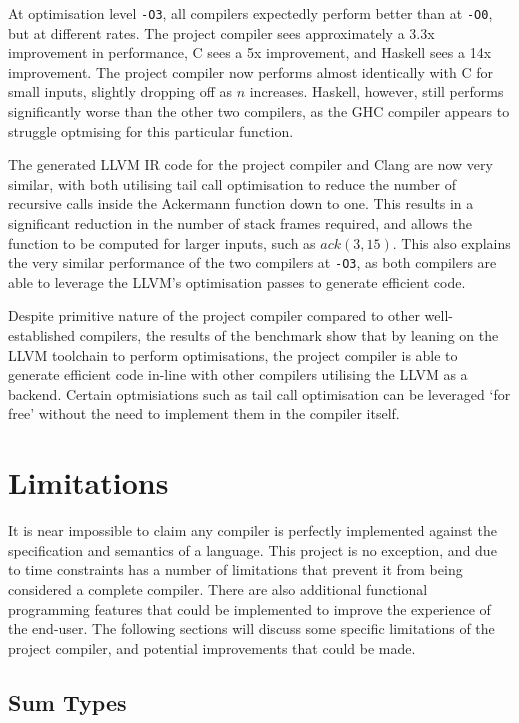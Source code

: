 At optimisation level \texttt{-O3}, all compilers expectedly perform better than at \texttt{-O0},
but at different rates. The project compiler sees approximately a 3.3x improvement in performance, C
sees a 5x improvement, and Haskell sees a 14x improvement. The project compiler now performs almost
identically with C for small inputs, slightly dropping off as $n$ increases. Haskell, however, still
performs significantly worse than the other two compilers, as the GHC compiler appears to struggle
optmising for this particular function.

The generated LLVM IR code for the project compiler and Clang are now very similar, with both
utilising tail call optimisation to reduce the number of recursive calls inside the Ackermann
function down to one. This results in a significant reduction in the number of stack frames
required, and allows the function to be computed for larger inputs, such as $ack(3,15)$. This also
explains the very similar performance of the two compilers at \texttt{-O3}, as both compilers are
able to leverage the LLVM's optimisation passes to generate efficient code.

Despite primitive nature of the project compiler compared to other well-established compilers, the
results of the benchmark show that by leaning on the LLVM toolchain to perform optimisations, the
project compiler is able to generate efficient code in-line with other compilers utilising the LLVM
as a backend. Certain optmisiations such as tail call optimisation can be leveraged `for free'
without the need to implement them in the compiler itself.

\section{Limitations}

It is near impossible to claim any compiler is perfectly implemented against the specification and
semantics of a language. This project is no exception, and due to time constraints has a number of
limitations that prevent it from being considered a complete compiler. There are also additional
functional programming features that could be implemented to improve the experience of the end-user.
The following sections will discuss some specific limitations of the project compiler, and potential
improvements that could be made.

\subsection{Sum Types}

